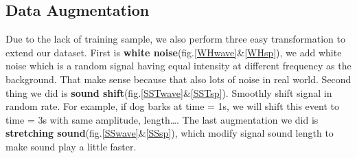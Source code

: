 \subsection{Data Augmentation}
Due to the lack of training sample, we also perform three easy transformation to extend our dataset. 
First is \textbf{white noise}(fig.\ref{WHwave}\&\ref{WHsp}), we add white noise which is a random signal having equal intensity at different frequency as the background.
That make sense because that also lots of noise in real world. Second thing we did is \textbf{sound shift}(fig.\ref{SSTwave}\&\ref{SSTsp}). Smoothly shift signal in random rate. For example, if dog barks at time = 1s, we will shift this event to time = 3s with same amplitude, length\ldots. 
The last augmentation we did is \textbf{stretching sound}(fig.\ref{SSwave}\&\ref{SSsp}), which modify signal sound length to make sound play a little faster.
